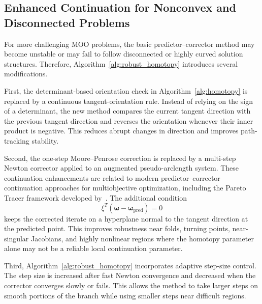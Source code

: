 \documentclass[11pt,pdflatex,sn-mathphys-ay]{sn-jnl}%
\theoremstyle{definition}
\theoremstyle{thmstyleone}%
\theoremstyle{thmstyletwo}%
\theoremstyle{thmstylethree}%
\begin{document}
	\subsection{Enhanced Continuation for Nonconvex and Disconnected Problems}
	
	For more challenging MOO problems, the basic predictor--corrector method may become unstable or may fail to follow disconnected or highly curved solution structures. 
	Therefore, Algorithm~\ref{alg:robust_homotopy} introduces several modifications.
	
	First, the determinant-based orientation check in Algorithm~\ref{alg:homotopy} is replaced by a continuous tangent-orientation rule. 
	Instead of relying on the sign of a determinant, the new method compares the current tangent direction with the previous tangent direction and reverses the orientation whenever their inner product is negative. 
	This reduces abrupt changes in direction and improves path-tracking stability.
	
	Second, the one-step Moore--Penrose correction is replaced by a multi-step Newton corrector applied to an augmented pseudo-arclength system. These continuation enhancements are related to modern predictor--corrector continuation approaches for multiobjective optimization, including the Pareto Tracer framework developed by~\cite{martin2018pareto}.
	The additional condition
	\[
	\xi^T(\bm{\omega}-\bm{\omega}_{\mathrm{pred}})=0
	\]
	keeps the corrected iterate on a hyperplane normal to the tangent direction at the predicted point. 
	This improves robustness near folds, turning points, near-singular Jacobians, and highly nonlinear regions where the homotopy parameter alone may not be a reliable local continuation parameter.
	
	Third, Algorithm~\ref{alg:robust_homotopy} incorporates adaptive step-size control. 
	The step size is increased after fast Newton convergence and decreased when the corrector converges slowly or fails. 
	This allows the method to take larger steps on smooth portions of the branch while using smaller steps near difficult regions.
	
\end{document}
